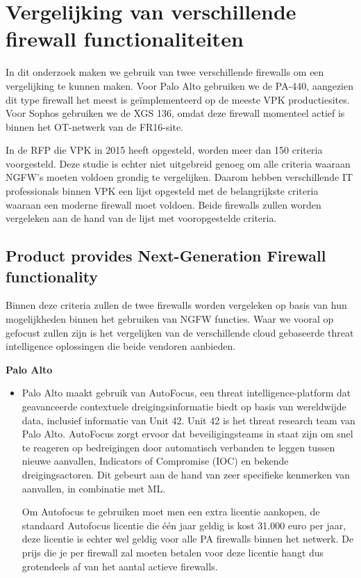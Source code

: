 \section{Vergelijking van verschillende firewall functionaliteiten}
In dit onderzoek maken we gebruik van twee verschillende firewalls om een vergelijking te kunnen maken. Voor Palo Alto gebruiken we de PA-440, aangezien dit type firewall het meest is geïmplementeerd op de meeste VPK productiesites. Voor Sophos gebruiken we de XGS 136, omdat deze firewall momenteel actief is binnen het OT-netwerk van de FR16-site.

In de RFP die VPK in 2015 heeft opgesteld, worden meer dan 150 criteria voorgesteld. Deze studie is echter niet uitgebreid genoeg om alle criteria waaraan NGFW’s moeten voldoen grondig te vergelijken. Daarom hebben verschillende IT professionals binnen VPK een lijst opgesteld met de belangrijkste criteria waaraan een moderne firewall moet voldoen. Beide firewalls zullen worden vergeleken aan de hand van de lijst met vooropgestelde criteria.




\subsection{Product provides Next-Generation Firewall functionality}

Binnen deze criteria zullen de twee firewalls worden vergeleken op basis van hun mogelijkheden binnen het gebruiken van NGFW functies. Waar we vooral op gefocust zullen zijn is het vergelijken van de verschillende cloud gebaseerde threat intelligence oplossingen die beide vendoren aanbieden.


\textbf{Palo Alto}
\begin{itemize}[label=\textbullet]
    \item Palo Alto maakt gebruik van AutoFocus, een threat intelligence-platform dat geavanceerde contextuele dreigingsinformatie biedt op basis van wereldwijde data, inclusief informatie van Unit 42. Unit 42 is het threat research team van Palo Alto. AutoFocus zorgt ervoor dat beveiligingsteams in staat zijn om snel te reageren op bedreigingen door automatisch verbanden te leggen tussen nieuwe aanvallen, Indicators of Compromise (IOC) en bekende dreigingsactoren. Dit gebeurt aan de hand van zeer specifieke kenmerken van aanvallen, in combinatie met ML.\autocite{PaloAltoAF2025}
    
    Om Autofocus te gebruiken moet men een extra licentie aankopen, de standaard Autofocus licentie die één jaar geldig is kost 31.000 euro per jaar, deze licentie is echter wel geldig voor alle PA firewalls binnen het netwerk. De prijs die je per firewall zal moeten betalen voor deze licentie hangt dus grotendeels af van het aantal actieve firewalls.
\end{itemize}

